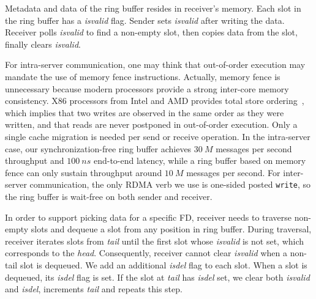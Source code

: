 Metadata and data of the ring buffer resides in receiver's memory. Each slot in the ring buffer has a \textit{isvalid} flag. Sender sets \textit{isvalid} after writing the data. Receiver polls \textit{isvalid} to find a non-empty slot, then copies data from the slot, finally clears \textit{isvalid}.

For intra-server communication, one may think that out-of-order execution may mandate the use of memory fence instructions. Actually, memory fence is unnecessary because modern processors provide a strong inter-core memory consistency. X86 processors from Intel and AMD provides total store ordering~\cite{sewell2010x86,intel-manual}, which implies that two writes are observed in the same order as they were written, and that reads are never postponed in out-of-order execution. Only a single cache migration is needed per send or receive operation. In the intra-server case, our synchronization-free ring buffer achieves $30~M$ messages per second throughput and $100~ns$ end-to-end latency, while a ring buffer based on memory fence can only sustain throughput around $10~M$ messages per second.
For inter-server communication, the only RDMA verb we use is one-sided posted \texttt{write}, so the ring buffer is wait-free on both sender and receiver.

In order to support picking data for a specific FD, receiver needs to traverse non-empty slots and dequeue a slot from any position in ring buffer. During traversal, receiver iterates slots from \textit{tail} until the first slot whose \textit{isvalid} is not set, which corresponds to the \textit{head}. Consequently, receiver cannot clear \textit{isvalid} when a non-tail slot is dequeued. We add an additional \textit{isdel} flag to each slot. When a slot is dequeued, its \textit{isdel} flag is set. If the slot at \textit{tail} has \textit{isdel} set, we clear both \textit{isvalid} and \textit{isdel}, increments \textit{tail} and repeats this step.




